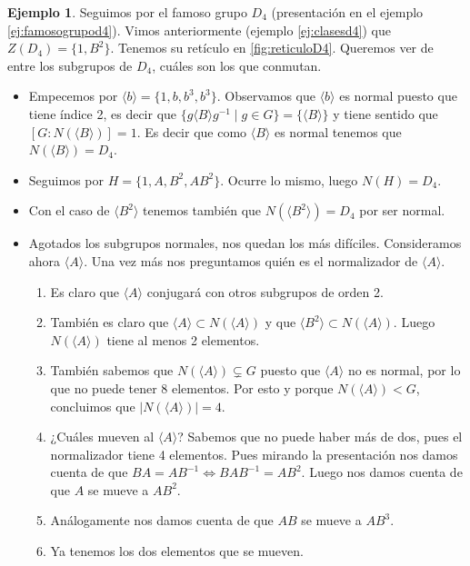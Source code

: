 \documentclass{book}
\theoremstyle{definition}
\newtheorem{ej}{Ejemplo}
\theoremstyle{remark}
\newcommand{\inv}[1]{#1^{-1}}
\begin{document}
\begin{ej}
	Seguimos por el famoso grupo $D_4$ (presentación en el ejemplo \ref{ej:famosogrupod4}). Vimos anteriormente (ejemplo \ref{ej:clasesd4}) que $Z(D_4) = \{1, B^2\}$. Tenemos su retículo en \ref{fig:reticuloD4}. Queremos ver de entre los subgrupos de $D_4$, cuáles son los que conmutan.
	\begin{itemize}
		\item Empecemos por $\langle b \rangle = \{1, b, b^3, b^3\}$. Observamos que $\langle b \rangle$ es normal puesto que tiene índice 2, es decir que $\{g\langle B \rangle \inv{g} \mid g \in G\} = \{\langle B \rangle\}$ y tiene sentido que $[G:N(\langle B \rangle)] = 1$. Es decir que como $\langle B \rangle$ es normal tenemos que $N(\langle B \rangle) = D_4$.
		\item Seguimos por $H = \{1, A, B^2, AB^2\}$. Ocurre lo mismo, luego $N(H) = D_4$.
		\item Con el caso de $\langle B^2 \rangle$ tenemos también que $N(\langle B^2 \rangle) = D_4$ por ser normal.
		\item Agotados los subgrupos normales, nos quedan los más difíciles. Consideramos ahora $\langle A \rangle$. Una vez más nos preguntamos quién es el normalizador de $\langle A \rangle$.
		\begin{enumerate}
			\item Es claro que $\langle A \rangle$ conjugará con otros subgrupos de orden 2.
			\item También es claro que $\langle A \rangle \subset N(\langle A \rangle)$ y que $\langle B^2 \rangle \subset N(\langle A \rangle)$. Luego $N(\langle A \rangle)$ tiene al menos 2 elementos.
			\item También sabemos que $N(\langle A \rangle) \subsetneq G$ puesto que $\langle A \rangle$ no es normal, por lo que no puede tener 8 elementos. Por esto y porque $N(\langle A \rangle) < G$, concluimos que $|N(\langle A \rangle)| = 4$.
			\item ¿Cuáles mueven al $\langle A \rangle$? Sabemos que no puede haber más de dos, pues el normalizador tiene 4 elementos. Pues mirando la presentación nos damos cuenta de que $BA = A\inv{B} \iff BA\inv{B} = AB^2$. Luego nos damos cuenta de que $A$ se mueve a $AB^2$.
			\item Análogamente nos damos cuenta de que $AB$ se mueve a $AB^3$.
			\item Ya tenemos los dos elementos que se mueven.
		\end{enumerate}
	\end{itemize}
\end{ej}
\end{document}
